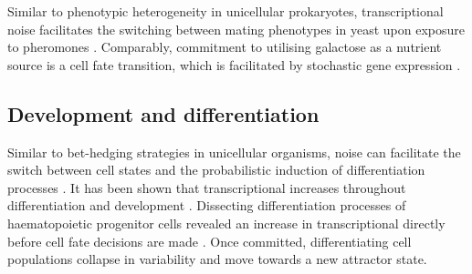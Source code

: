Similar to phenotypic heterogeneity in unicellular prokaryotes, transcriptional noise facilitates the switching between mating phenotypes in yeast upon exposure to pheromones \citep{Paliwal2007}. 
Comparably, commitment to utilising galactose as a nutrient source is a cell fate transition, which is facilitated by stochastic gene expression \cite{Acar2008}. \\


\subsection{Development and differentiation}

Similar to bet-hedging strategies in unicellular organisms, noise can facilitate the switch between cell states and the probabilistic induction of differentiation processes \citep{Eldar2010, Chang2008}.
It has been shown that transcriptional  increases throughout differentiation \citep{Stumpf2017} and development \citep{Antolovic2017}. 
Dissecting differentiation processes of haematopoietic progenitor cells revealed an increase in transcriptional  directly before cell fate decisions are made \citep{Mojtahedi2016, Richard2016}. 
Once committed, differentiating cell populations collapse in variability and move towards a new attractor state. 
\\

